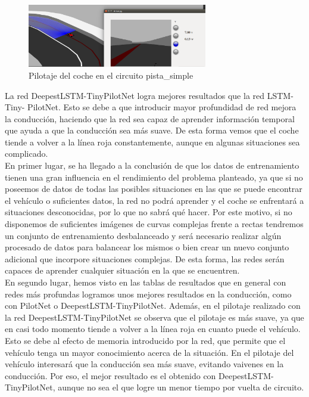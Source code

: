 \begin{figure}[H]
\begin{center}
	\includegraphics[width=0.7\textwidth]{figures/Regresion/deep_small.png}
   \caption{Pilotaje del coche en el circuito pista\_simple}
	\label{fig.small_reg}
\end{center}
\end{figure}



La red DeepestLSTM-TinyPilotNet logra mejores resultados que la red LSTM-Tiny- PilotNet. Esto se debe a que introducir mayor profundidad de red mejora la conducción, haciendo que la red sea capaz de aprender información temporal que ayuda a que la conducción sea más suave. De esta forma vemos que el coche tiende a volver a la línea roja constantemente, aunque en algunas situaciones sea complicado. \\



En primer lugar, se ha llegado a la conclusión de que los datos de entrenamiento tienen una gran influencia en el rendimiento del problema planteado, ya que si no poseemos de datos de todas las posibles situaciones en las que se puede encontrar el vehículo o suficientes datos, la red no podrá aprender y el coche se enfrentará a situaciones desconocidas, por lo que no sabrá qué hacer. Por este motivo, si no disponemos de suficientes imágenes de curvas complejas frente a rectas tendremos un conjunto de entrenamiento desbalanceado y será necesario realizar algún procesado de datos para balancear los mismos o bien crear un nuevo conjunto adicional que incorpore situaciones complejas. De esta forma, las redes serán capaces de aprender cualquier situación en la que se encuentren.\\


En segundo lugar, hemos visto en las tablas de resultados que en general con redes más profundas logramos unos mejores resultados en la conducción, como con PilotNet o DeepestLSTM-TinyPilotNet. Además, en el pilotaje realizado con la red DeepestLSTM-TinyPilotNet se observa que el pilotaje es más suave, ya que en casi todo momento tiende a volver a la línea roja en cuanto puede el vehículo. Esto se debe al efecto de memoria introducido por la red, que permite que el vehículo tenga un mayor conocimiento acerca de la situación. En el pilotaje del vehículo interesará que la conducción sea más suave, evitando vaivenes en la conducción. Por eso, el mejor resultado es el obtenido con DeepestLSTM-TinyPilotNet, aunque no sea el que logre un menor tiempo por vuelta de circuito.\\




